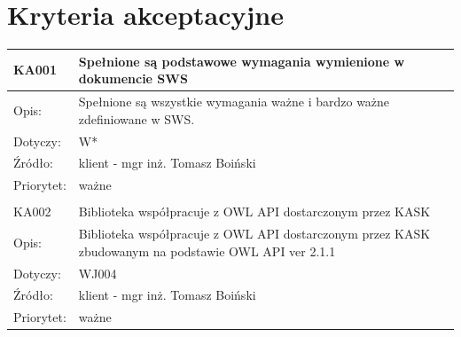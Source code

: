 \documentclass[a4paper,10pt]{article}
\begin{document}
\section{Kryteria akceptacyjne}


\begin{center}

\begin{tabular}{|m{3cm}|m{9cm}|} \hline

KA001 & Spełnione są podstawowe wymagania wymienione w dokumencie SWS \\ \hline
Opis: & Spełnione są wszystkie wymagania ważne i bardzo ważne zdefiniowane w SWS. \\ \hline
Dotyczy: & W* \\ \hline
Źródło: & klient - mgr inż. Tomasz Boiński \\ \hline
Priorytet: & ważne  \\ \hline %

\multicolumn{2}{c}{} \\
 \hline

KA002 & Biblioteka współpracuje z OWL API dostarczonym przez KASK \\ \hline
Opis: & Biblioteka współpracuje z OWL API dostarczonym przez KASK zbudowanym na podstawie OWL API ver 2.1.1\\ \hline
Dotyczy: & WJ004 \\ \hline
Źródło: & klient - mgr inż. Tomasz Boiński \\ \hline
Priorytet: & ważne  \\ \hline %

\end{tabular}
 
\end{center}

\clearpage
{}
{}

\end{document}
